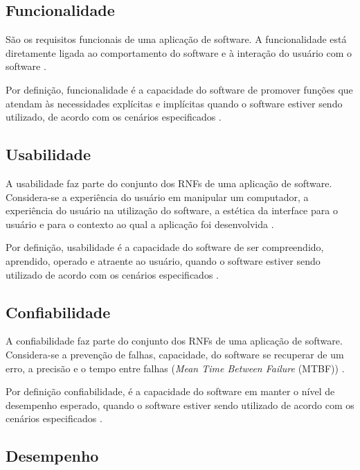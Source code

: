 \subsection{Funcionalidade}
\label{subsec:funcionalidade}

São os requisitos funcionais de uma aplicação de software. A funcionalidade está diretamente ligada ao comportamento do software e à interação do usuário com o software \cite{cintra2006implementaccao}.

Por definição, funcionalidade é a capacidade do software de promover funções que atendam às necessidades explícitas e implícitas quando o software estiver sendo utilizado, de acordo com os cenários especificados \cite{qualidadeDeProdutoNBR}.

\subsection{Usabilidade}
\label{subsec:usabilidade}

A usabilidade faz parte do conjunto dos RNFs de uma aplicação de software. Considera-se a experiência do usuário em manipular um computador, a experiência do usuário na utilização do software, a estética da interface para o usuário e para o contexto ao qual a aplicação foi desenvolvida \cite{cintra2006implementaccao}.

Por definição, usabilidade é a capacidade do software de ser compreendido, aprendido, operado e atraente ao usuário, quando o software estiver sendo utilizado de acordo com os cenários especificados \cite{qualidadeDeProdutoNBR}.


\subsection{Confiabilidade}
\label{subsec:confiabilidade}

A confiabilidade faz parte do conjunto dos RNFs de uma aplicação de software. Considera-se a prevenção de falhas, capacidade, do software se recuperar de um erro, a precisão e o tempo entre falhas (\textit{Mean Time Between Failure} (MTBF)) \cite{cintra2006implementaccao}.

Por definição confiabilidade, é a capacidade do software em manter o nível de desempenho esperado, quando o software estiver sendo utilizado de acordo com os cenários especificados \cite{qualidadeDeProdutoNBR}.  

\subsection{Desempenho}
\label{subsec:desempenho}

